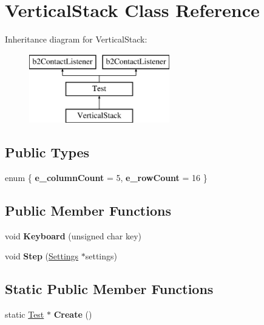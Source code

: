 \hypertarget{class_vertical_stack}{\section{Vertical\-Stack Class Reference}
\label{class_vertical_stack}
}
Inheritance diagram for Vertical\-Stack\-:\begin{figure}[H]
\begin{center}
\leavevmode
\includegraphics[height=3.000000cm]{class_vertical_stack}
\end{center}
\end{figure}
\subsection*{Public Types}
\begin{DoxyCompactItemize}
\item 
enum \{ {\bfseries e\-\_\-column\-Count} =  5, 
{\bfseries e\-\_\-row\-Count} =  16
 \}
\end{DoxyCompactItemize}
\subsection*{Public Member Functions}
\begin{DoxyCompactItemize}
\item 
\hypertarget{class_vertical_stack_aafa33bb938ecacc26ee1eddce55abbdf}{void {\bfseries Keyboard} (unsigned char key)}\label{class_vertical_stack_aafa33bb938ecacc26ee1eddce55abbdf}

\item 
\hypertarget{class_vertical_stack_a1bc159f0156fce14700e307287fbe49f}{void {\bfseries Step} (\hyperlink{struct_settings}{Settings} $\ast$settings)}\label{class_vertical_stack_a1bc159f0156fce14700e307287fbe49f}

\end{DoxyCompactItemize}
\subsection*{Static Public Member Functions}
\begin{DoxyCompactItemize}
\item 
\hypertarget{class_vertical_stack_a930de7537aa11a475ea6c5e683c79b87}{static \hyperlink{class_test}{Test} $\ast$ {\bfseries Create} ()}\label{class_vertical_stack_a930de7537aa11a475ea6c5e683c79b87}

\end{DoxyCompactItemize}
